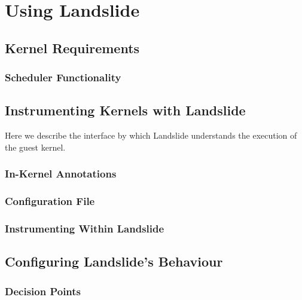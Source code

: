 \chapter{Using Landslide}
\label{sec:using}

\section{Kernel Requirements}
\label{sec:using-requirements}

\subsection{Scheduler Functionality}
\label{sec:using-requirements-sched}

\section{Instrumenting Kernels with Landslide}

Here we describe the interface by which Landslide understands the execution of the guest kernel.

\subsection{In-Kernel Annotations}
\label{sec:using-annotations}

\subsection{Configuration File}
\label{sec:using-config-landslide}

\subsection{Instrumenting Within Landslide}
\label{sec:using-student-c}


\section{Configuring Landslide's Behaviour}
\label{sec:using-customise}
\subsection{Decision Points}
\label{sec:using-decision}
